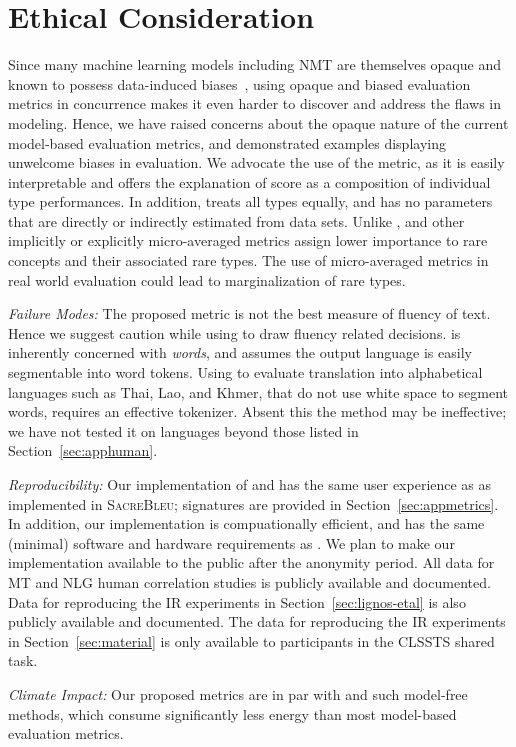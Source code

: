 \section{Ethical Consideration}

Since many machine learning models including NMT are themselves opaque and known to possess data-induced biases~\cite{prates2019-mt-bias}, using opaque and biased evaluation metrics in concurrence makes it even harder to discover and address the flaws in modeling.
Hence, we have raised concerns about the opaque nature of the current model-based evaluation metrics, and demonstrated examples displaying unwelcome biases in evaluation. We advocate the use of the  metric, as it is easily interpretable and offers the explanation of score as a composition of individual type performances.
In addition,  treats all types equally, and has no parameters that are directly or indirectly estimated from data sets. Unlike ,  and other implicitly or explicitly micro-averaged metrics assign lower importance to rare concepts and their associated rare types. 
The use of micro-averaged metrics in real world evaluation could lead to marginalization of rare types.


\textit{Failure Modes:}
The proposed  metric is not the best measure of fluency of text. 
Hence we suggest caution while using  to draw fluency related decisions.  is inherently concerned with \textit{words}, and assumes the output language is easily segmentable into word tokens. Using  to evaluate translation into alphabetical languages such as Thai, Lao, and Khmer, that do not use white space to segment words, requires an effective tokenizer. Absent this the method may be ineffective; we have not tested it on languages beyond those listed in Section~\ref{sec:apphuman}.

\textit{Reproducibility:}
Our implementation of  and  has the same user experience as \bleu{} as implemented in \textsc{SacreBleu}; signatures are provided in Section~\ref{sec:appmetrics}. 
In addition, our implementation is  compuationally efficient, and has the same (minimal) software and hardware requirements as \bleu{}. 
We plan to make our implementation available to the public after the anonymity period. All data for MT and NLG human correlation studies is publicly available and documented. Data for reproducing the IR experiments in Section~\ref{sec:lignos-etal} is also publicly available and documented. The data for reproducing the IR experiments in Section~\ref{sec:material} is only available to participants in the CLSSTS shared task. 

\textit{Climate Impact:} Our proposed metrics are in par with \bleu{} and such model-free methods, which consume significantly less energy than most model-based evaluation metrics.

